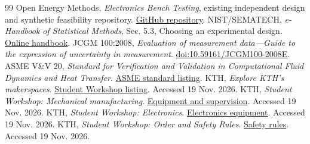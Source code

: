 \documentclass[11pt,a4paper]{article}
\begin{document}
\begingroup\small\setlength{\parskip}{1pt}
\begin{thebibliography}{99}\setlength{\itemsep}{2pt}\setlength{\parsep}{0pt}
 Open Energy Methods, \emph{Electronics Bench Testing}, existing independent design and synthetic feasibility repository. \href{https://github.com/Open-Energy-Methods/electronics-bench-testing}{GitHub repository}.
 NIST/SEMATECH, \emph{e-Handbook of Statistical Methods}, Sec. 5.3, Choosing an experimental design. \href{https://www.itl.nist.gov/div898/handbook/pri/section3/pri3.htm}{Online handbook}.
 JCGM 100:2008, \emph{Evaluation of measurement data---Guide to the expression of uncertainty in measurement}. \href{https://doi.org/10.59161/JCGM100-2008E}{doi:10.59161/JCGM100-2008E}.
 ASME V\&V 20, \emph{Standard for Verification and Validation in Computational Fluid Dynamics and Heat Transfer}. \href{https://www.asme.org/codes-standards/find-codes-standards/standard-for-verification-and-validation-in-computational-fluid-dynamics-and-heat-transfer}{ASME standard listing}.
 KTH, \emph{Explore KTH's makerspaces}. \href{https://www.kth.se/en/student/kontakt/campus/makerspaces/explore/explore-1.1455863}{Student Workshop listing}. Accessed 19 Nov. 2026.
 KTH, \emph{Student Workshop: Mechanical manufacturing}. \href{https://www.kth.se/emp/student-workshop/verkstan/mekanik-1.686913}{Equipment and supervision}. Accessed 19 Nov. 2026.
 KTH, \emph{Student Workshop: Electronics}. \href{https://www.kth.se/emp/student-workshop/verkstan/elektronik-1.686912}{Electronics equipment}. Accessed 19 Nov. 2026.
 KTH, \emph{Student Workshop: Order and Safety Rules}. \href{https://www.kth.se/emp/student-workshop/regler-och-sakerhet}{Safety rules}. Accessed 19 Nov. 2026.
\end{thebibliography}\endgroup
\end{document}
